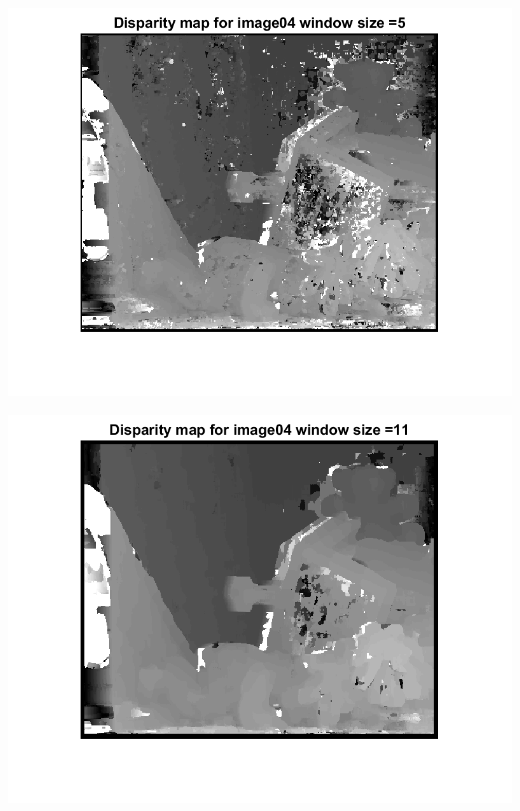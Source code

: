 \documentclass[a4paper]{iacas}
\begin{document}
\vskip 0.1in
\begin{minipage}{\linewidth}
	\includegraphics[scale=1]{results/04_16_06/disp_map_04_template_1.png}
	\label{fig_4}
\end{minipage}
\vskip 0.1in
\begin{minipage}{\linewidth}
	\includegraphics[scale=1]{results/04_16_06/disp_map_04_template_2.png}
	\label{fig_4}
\end{minipage}
\vskip 0.1in
\end{document}
